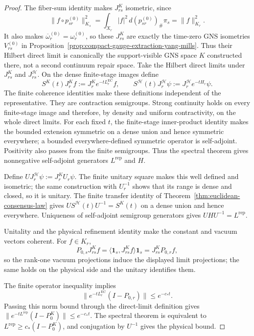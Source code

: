 \begin{proof}
The fiber-sum identity makes \(J^K_{rs}\) isometric, since
\[
\|f\circ p_{sr}^{(0)}\|_{K_s}^2
=\int_{X_r}|f|^2\,d(p_{sr}^{(0)})_\#\pi_s
=\|f\|_{K_r}^2.
\]
It also makes \(\overline\omega_r^{(0)}=\omega_r^{(0)}\), so these \(J^K_{rs}\) are exactly the
time-zero GNS isometries \(V_{rs}^{(0)}\) in
Proposition~\ref{prop:compact-gauge-extraction-yang-mills}. Thus their
Hilbert direct limit is canonically the support-visible GNS space \(K\) constructed there, not a
second continuum repair space.
Take the Hilbert direct limits under \(J^K_{rs}\) and \(J^{\mathcal H}_{rs}\). On the dense
finite-stage images define
\[
S^K(t)J_r^Kf:=J_r^Ke^{-tL_r^{\mathrm{EC}}}f,
\qquad
S^{\mathcal H}(t)J_r^{\mathcal H}\psi
:=J_r^{\mathcal H}e^{-tH_r}\psi.
\]
The finite coherence identities make these definitions independent of the representative. They
are contraction semigroups. Strong continuity holds on every finite-stage image and therefore,
by density and uniform contractivity, on the whole direct limits. For each fixed \(t\), the
finite-stage inner-product identity makes the bounded extension symmetric on a dense union and
hence symmetric everywhere; a bounded everywhere-defined symmetric operator is self-adjoint.
Positivity also passes from the finite semigroups. Thus the spectral theorem gives nonnegative
self-adjoint generators \(L^{\mathrm{rep}}\) and \(H\).

Define \(UJ_r^{\mathcal H}\psi:=J_r^KU_r\psi\). The finite unitary square makes this well defined
and isometric; the same construction with \(U_r^{-1}\) shows that its range is dense and closed,
so it is unitary. The finite transfer identity of
Theorem~\ref{thm:euclidean-consensus-law} gives
\(US^{\mathcal H}(t)U^{-1}=S^K(t)\) on a dense union and hence everywhere. Uniqueness of
self-adjoint semigroup generators gives \(UHU^{-1}=L^{\mathrm{rep}}\).

Unitality and the physical refinement identity make the constant and vacuum vectors coherent.
For \(f\in K_r\),
\[
P_{0,s}J^K_{rs}f
=\langle\mathbf 1_s,J^K_{rs}f\rangle\mathbf 1_s
=J^K_{rs}P_{0,r}f,
\]
so the rank-one vacuum projections induce the displayed limit projections; the same holds on the
physical side and the unitary identifies them.

The finite operator inequality implies
\[
\|e^{-tL_r^{\mathrm{EC}}}(I-P_{0,r})\|\le e^{-c_*t}.
\]
Passing this norm bound through the direct-limit definition gives
\(\|e^{-tL^{\mathrm{rep}}}(I-P_0^K)\|\le e^{-c_*t}\). The spectral theorem is equivalent to
\(L^{\mathrm{rep}}\ge c_*(I-P_0^K)\), and conjugation by \(U^{-1}\) gives the physical bound.
\end{proof}

